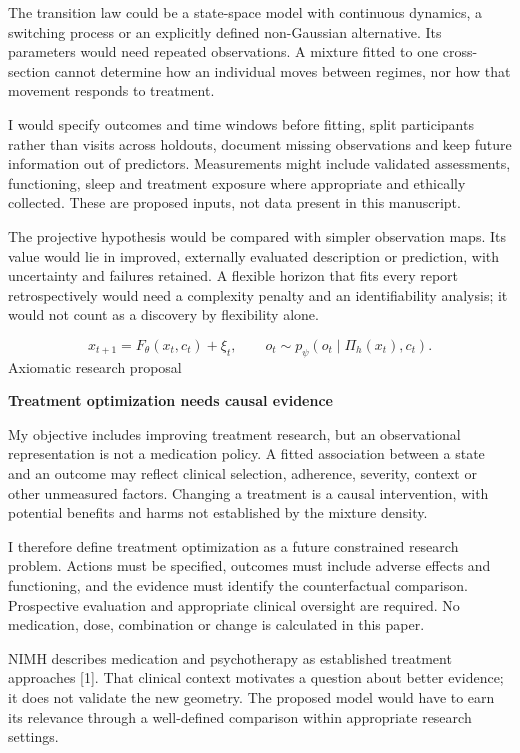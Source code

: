 \documentclass[10pt]{article}
\begin{document}
The transition law could be a state-space model with continuous dynamics, a switching process or an explicitly defined non-Gaussian alternative. Its parameters would need repeated observations. A mixture fitted to one cross-section cannot determine how an individual moves between regimes, nor how that movement responds to treatment.\par
I would specify outcomes and time windows before fitting, split participants rather than visits across holdouts, document missing observations and keep future information out of predictors. Measurements might include validated assessments, functioning, sleep and treatment exposure where appropriate and ethically collected. These are proposed inputs, not data present in this manuscript.\par
The projective hypothesis would be compared with simpler observation maps. Its value would lie in improved, externally evaluated description or prediction, with uncertainty and failures retained. A flexible horizon that fits every report retrospectively would need a complexity penalty and an identifiability analysis; it would not count as a discovery by flexibility alone.\par
\[x_{t+1}=F_\theta(x_t,c_t)+\xi_t,\qquad o_t\sim p_\psi(o_t\mid\Pi_h(x_t),c_t).\]
\clearpage
{\small\color{accent}Axiomatic research proposal}\par
{\LARGE\bfseries\color{ink}Treatment optimization needs causal evidence}\par\vspace{7pt}
My objective includes improving treatment research, but an observational representation is not a medication policy. A fitted association between a state and an outcome may reflect clinical selection, adherence, severity, context or other unmeasured factors. Changing a treatment is a causal intervention, with potential benefits and harms not established by the mixture density.\par
I therefore define treatment optimization as a future constrained research problem. Actions must be specified, outcomes must include adverse effects and functioning, and the evidence must identify the counterfactual comparison. Prospective evaluation and appropriate clinical oversight are required. No medication, dose, combination or change is calculated in this paper.\par
NIMH describes medication and psychotherapy as established treatment approaches [1]. That clinical context motivates a question about better evidence; it does not validate the new geometry. The proposed model would have to earn its relevance through a well-defined comparison within appropriate research settings.\par
\end{document}
